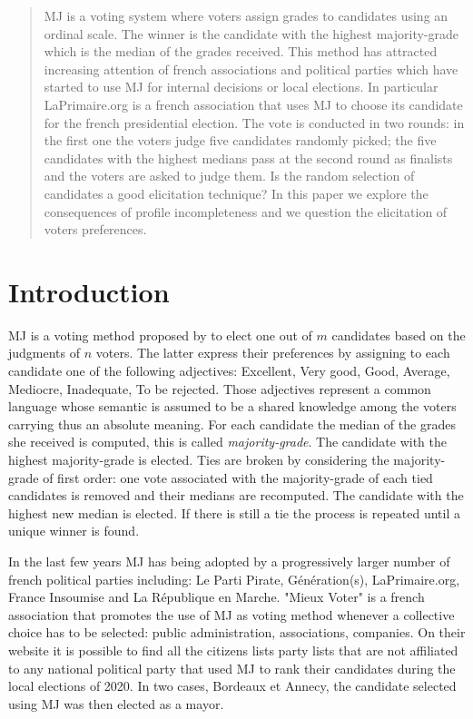 
\begin{abstract}
\ac{MJ} is a voting system where voters assign grades to candidates using an ordinal scale. The winner is the candidate with the highest majority-grade \textemdash which is the median of the grades received. This method has attracted increasing attention of french associations and political parties which have started to use \ac{MJ} for internal decisions or local elections. In particular LaPrimaire.org is a french association that uses \ac{MJ} to choose its candidate for the french presidential election. The vote is conducted in two rounds: in the first one the voters judge five candidates randomly picked; the five candidates with the highest medians pass at the second round as finalists and the voters are asked to judge them. Is the random selection of candidates a good elicitation technique? In this paper we explore the consequences of profile incompleteness and we question the elicitation of voters preferences.
\end{abstract}

\section{Introduction}
\label{sec:intro}
\ac{MJ} is a voting method proposed by \citet{Balinski2007,Balinski2011} to elect one out of $m$ candidates based on the judgments of $n$ voters. The latter express their preferences by assigning to each candidate one of the following adjectives: Excellent, Very good, Good, Average, Mediocre, Inadequate, To be rejected. Those adjectives represent a common language whose semantic is assumed to be a shared knowledge among the voters carrying thus an absolute meaning. For each candidate the median of the grades she received is computed, this is called \textit{majority-grade}. The candidate with the highest majority-grade is elected. Ties are broken by considering the majority-grade of first order: one vote associated with the majority-grade of each tied candidates is removed and their medians are recomputed. The candidate with the highest new median is elected. If there is still a tie the process is repeated until a unique winner is found. 

In the last few years \ac{MJ} has being adopted by a progressively larger number of french political parties including: Le Parti Pirate, Génération(s), LaPrimaire.org, France Insoumise and La République en Marche.
"Mieux Voter" \citep{MV} is a french association that promotes the use of \ac{MJ} as voting method whenever a collective choice has to be selected: public administration, associations, companies. On their website it is possible to find all the citizens lists \textendash party lists that are not affiliated to any national political party \textemdash that used \ac{MJ} to rank their candidates during the local elections of 2020. In two cases, Bordeaux et Annecy, the candidate selected using \ac{MJ} was then elected as a mayor. 

